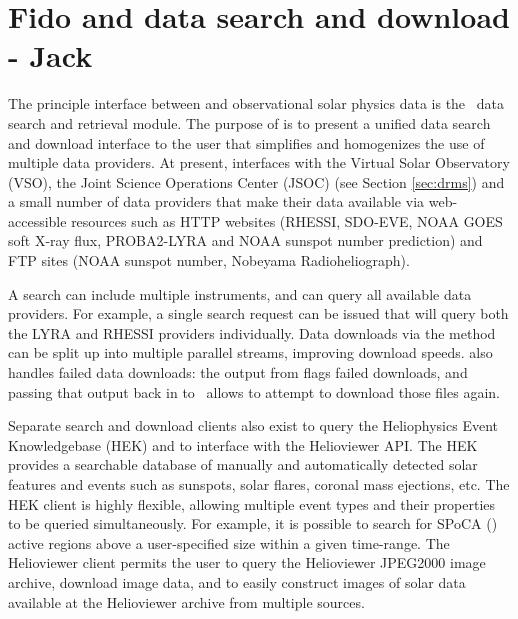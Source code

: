 \section{Fido and data search and download - Jack}\label{fido}
The principle interface between \sunpy and observational solar physics data is the \Fido\ data search and retrieval module. The purpose of \Fido is to present a unified data search and download interface to the user that simplifies and homogenizes the use of multiple data providers.  At present, \Fido interfaces with the Virtual Solar Observatory (VSO), the Joint Science Operations Center (JSOC) (see Section \ref{sec:drms}) and a small number of data providers that make their data available via web-accessible resources such as HTTP websites (RHESSI, SDO-EVE, NOAA GOES soft X-ray flux, PROBA2-LYRA and NOAA sunspot number prediction) and FTP sites (NOAA sunspot number, Nobeyama Radioheliograph).

A \Fido search can include multiple instruments, and can query all available data providers.  For example, a single search request can be issued that will query both the LYRA and RHESSI providers individually.  Data downloads via the  method can be split up into multiple parallel streams, improving download speeds.  \Fido also handles failed data downloads: the output from  flags failed downloads, and passing that output back in to \ allows \Fido to attempt to download those files again.

Separate search and download clients also exist to query the Heliophysics Event Knowledgebase (HEK) and to interface with the Helioviewer API.  The HEK provides a searchable database of manually and automatically detected solar features and events such as sunspots, solar flares, coronal mass ejections, etc.  The HEK client is highly flexible, allowing multiple event types and their properties to be queried simultaneously.  For example, it is possible to search for SPoCA (\cite{2014AA...561A..29V}) active regions above a user-specified size within a given time-range.  The Helioviewer client permits the user to query the Helioviewer JPEG2000 image archive, download image data, and to easily construct images of solar data available at the Helioviewer archive from multiple sources.
